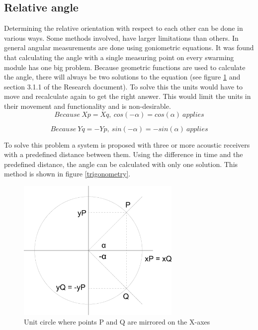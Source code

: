 \documentclass[10pt,a4paper]{article}
\begin{document}
\subsection{Relative angle}
Determining the relative orientation with respect to each other can be done in various ways. Some methods involved, have larger limitations than others. In general angular measurements are done using goniometric equations. It was found that calculating the angle with a single measuring point on every swarming module has one big problem\cite{Angle}. Because geometric functions are used to calculate the angle, there will always be two solutions to the equation (see figure \ref{circle} and section 3.1.1 of the Research document). To solve this the units would have to move and recalculate again to get the right answer. This would limit the units in their movement and functionality and is non-desirable.
\begin{equation}
Because\ Xp = Xq,\ cos(-\alpha) = cos(\alpha)\ applies
\end{equation}

\begin{equation}
Because\ Yq = -Yp,\ sin(-\alpha) = -sin(\alpha)\ applies
\end{equation}


To solve this problem a system is proposed with three or more acoustic receivers with a predefined distance between them. Using the difference in time and the predefined distance, the angle can be calculated with only one solution. This method is shown in figure \ref{trigonometry}.

\begin{figure}[H]
\centering
\includegraphics[width=0.7\textwidth]{Cirkel.pdf}
\caption{Unit circle where points P and Q are mirrored on the X-axes}
\label{circle}
\end{figure}
\end{document}

